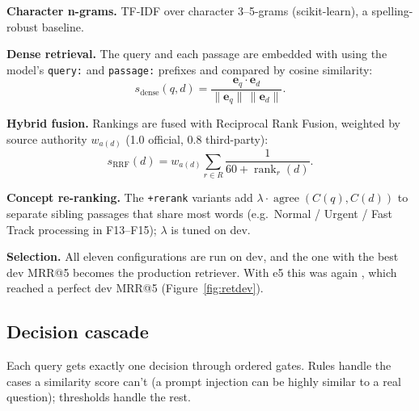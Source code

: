 \documentclass[11pt,a4paper]{article}
\begin{document}
\textbf{Character n-grams.} TF-IDF over character 3--5-grams (scikit-learn), a spelling-robust baseline.

\textbf{Dense retrieval.} The query and each passage are embedded with \texttt{\DenseModel} using the model's
\texttt{query:} and \texttt{passage:} prefixes and compared by cosine similarity:
\begin{equation}
s_{\text{dense}}(q, d) = \frac{\mathbf{e}_q \cdot \mathbf{e}_d}{\lVert \mathbf{e}_q \rVert\,\lVert \mathbf{e}_d \rVert}.
\end{equation}

\textbf{Hybrid fusion.} Rankings are fused with Reciprocal Rank Fusion, weighted by source authority $w_{a(d)}$ (1.0 official,
0.8 third-party):
\begin{equation}
s_{\text{RRF}}(d) = w_{a(d)} \sum_{r \in R} \frac{1}{60 + \operatorname{rank}_r(d)}.
\end{equation}

\textbf{Concept re-ranking.} The \texttt{+rerank} variants add $\lambda \cdot \operatorname{agree}(C(q), C(d))$ to separate
sibling passages that share most words (e.g.\ Normal / Urgent / Fast Track processing in F13--F15); $\lambda$ is tuned on dev.

\textbf{Selection.} All eleven configurations are run on dev, and the one with the best dev MRR@5 becomes the production
retriever. With e5 this was again \textbf{\FinalMethod}, which reached a perfect dev MRR@5 (Figure~\ref{fig:retdev}).

\subsection{Decision cascade}
\label{sec:decisions}
Each query gets exactly one decision through ordered gates. Rules handle the cases a similarity score can't (a prompt
injection can be highly similar to a real question); thresholds handle the rest.
\end{document}
